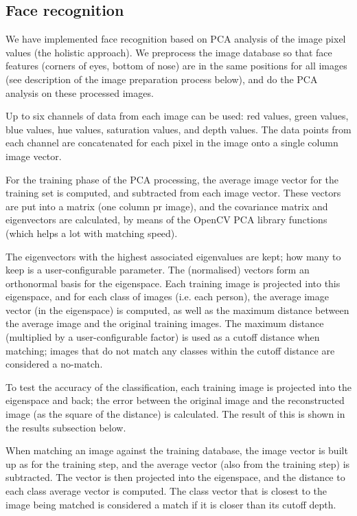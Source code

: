 
\subsection{Face recognition}
\label{sec:face-rec}
We have implemented face recognition based on PCA analysis of the image pixel
values (the holistic approach). We preprocess the image database so that face
features (corners of eyes, bottom of nose) are in the same positions for all
images (see description of the image preparation process below), and do the PCA
analysis on these processed images.

Up to six channels of data from each image can be used: red values, green
values, blue values, hue values, saturation values, and depth values. The data
points from each channel are concatenated for each pixel in the image onto a
single column image vector.

For the training phase of the PCA processing, the average image vector for the
training set is computed, and subtracted from each image vector. These vectors
are put into a matrix (one column pr image), and the covariance matrix and
eigenvectors are calculated, by means of the OpenCV PCA library functions (which
helps a lot with matching speed).

The eigenvectors with the highest associated eigenvalues are kept; how many to
keep is a user-configurable parameter. The (normalised) vectors form an
orthonormal basis for the eigenspace. Each training image is projected into this
eigenspace, and for each class of images (i.e. each person), the average image
vector (in the eigenspace) is computed, as well as the maximum distance between
the average image and the original training images. The maximum distance
(multiplied by a user-configurable factor) is used as a cutoff distance when
matching; images that do not match any classes within the cutoff distance are
considered a no-match.

To test the accuracy of the classification, each training image is projected
into the eigenspace and back; the error between the original image and the
reconstructed image (as the square of the distance) is calculated. The result of
this is shown in the results subsection below.

When matching an image against the training database, the image vector is built
up as for the training step, and the average vector (also from the training
step) is subtracted. The vector is then projected into the eigenspace, and the
distance to each class average vector is computed. The class vector that is
closest to the image being matched is considered a match if it is closer than
its cutoff depth.

